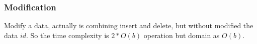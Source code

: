 \subsubsection{Modification}

Modify a data, actually is combining insert and delete, but without modified the data $id$. So the time complexity is $2 * O(b)$ operation but domain as $O(b)$.
